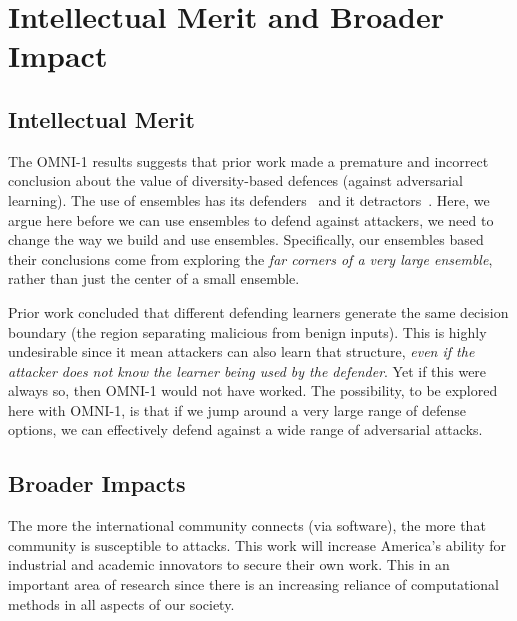   
  
 \section{Intellectual Merit and Broader Impact}
 \subsection{Intellectual Merit}
 The     OMNI-1  results suggests that  prior work made a premature and 
 incorrect conclusion about the value of diversity-based defences (against adversarial learning).  
   The use of ensembles
 has its
defenders~\cite{kariyappa2019improving,biggio2010multiple,DBLP:conf/iclr/TramerKPGBM18,smutz2016tree,kantchelian2016evasion} and it detractors~\cite{zhang2020decision,zhang2018gradient,he2017adversarial,DBLP:conf/iclr/TramerKPGBM18,DBLP:journals/corr/PapernotMG16}. 
Here, 
 we argue here before we can use ensembles to defend against attackers, we need to change the way we build and use ensembles.  Specifically, our ensembles based their  conclusions come from exploring the 
 {\em far corners of a very large ensemble}, rather than just the center
of a   small ensemble. 


  Prior work   concluded
    that    different  defending
  learners generate the  same decision boundary
  (the region separating malicious from benign inputs). This is highly
  undesirable since it  mean
   attackers can also learn that structure, {\em even if the attacker does not know
  the learner being used by the defender}.  Yet if this were always so, then OMNI-1 
  would not have worked.  The possibility, to be explored here with OMNI-1, is that  if we jump around a very large range of defense options, we can effectively defend against a wide range of adversarial attacks. 
  
  

 


\subsection{Broader Impacts} 

The more the international community connects (via software), the more that community
is susceptible to attacks. 
 This work will increase America’s ability for industrial and academic innovators to secure their own
 work.  
This in an important area of research since there  is an increasing reliance of
computational methods in all aspects of our society. 

